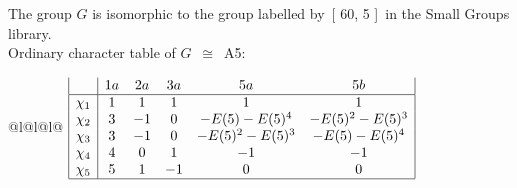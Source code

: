 \documentclass[varwidth=\maxdimen,border=10]{standalone}
\begin{document}
The group $G$ is isomorphic to the group labelled by\ [ 60, 5 ]\ in the Small Groups library.\\
Ordinary character table of $G$\ $\cong$\ A5:\\
\begin{center}
\begin{tabular}{@{}l@{}l@{}l@{}}
\hline
\(\begin{array}{|l|ccccc|}
  & 1a & 2a & 3a & 5a & 5b\\ \hline
\chi_{1} & 1 & 1 & 1 & 1 & 1\\
\chi_{2} & 3 & -1 & 0 & -E(5)-E(5)^{4} & -E(5)^{2}-E(5)^{3}\\
\chi_{3} & 3 & -1 & 0 & -E(5)^{2}-E(5)^{3} & -E(5)-E(5)^{4}\\
\chi_{4} & 4 & 0 & 1 & -1 & -1\\
\chi_{5} & 5 & 1 & -1 & 0 & 0\\
\hline
\end{array}\)\\
\end{tabular}
\end{center}
\end{document}
